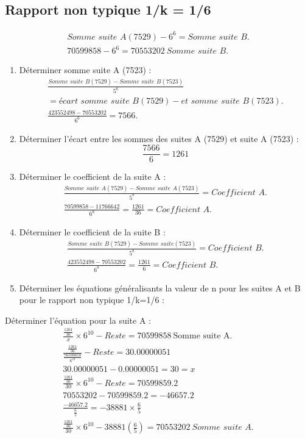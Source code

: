 \documentclass[11pt,a4paper]{article}
\begin{document}
\subsection{Rapport non typique 1/k = 1/6}
\begin{gather*}
\textit{Somme suite A}(7529)-6^{6}=\textit{Somme suite B.}\\
70599858-6^{6}=70553202\ \textit{Somme suite B.}
\end{gather*}
\begin{enumerate}[label=\arabic*.,start=2,leftmargin=*,itemsep=6pt]
\item Déterminer somme suite A (7523) :
\begin{gather*}
\frac{\textit{Somme suite B}(7529)-\textit{Somme suite B}(7523)}{5^{6}}\\
=\textit{écart somme suite B}(7529)-\textit{et somme suite B}(7523).\\
\frac{423552498-70553202}{6^{6}}=7566.
\end{gather*}
\item Déterminer l’écart entre les sommes des suites A (7529) et suite A (7523) :
\[
\frac{7566}{6}=1261
\]
\item Déterminer le coefficient de la suite A :
\begin{gather*}
\frac{\textit{Somme suite A}(7529)-\textit{Somme suite A}(7523)}{5^{8}}=\textit{Coefficient A.}\\
\frac{70599858-11766642}{6^{8}}=\frac{1261}{36}=\textit{Coefficient A.}
\end{gather*}
\item Déterminer le coefficient de la suite B :
\begin{gather*}
\frac{\textit{Somme suite B}(7529)-\textit{Somme suite}(7523)}{5^{8}}=\textit{Coefficient B.}\\
\frac{423552498-70553202}{6^{8}}=\frac{1261}{6}=\textit{Coefficient B.}
\end{gather*}
\item Déterminer les équations généralisants la valeur de n pour les suites A et B pour le rapport non typique 1/k=1/6 :
\end{enumerate}
Déterminer l’équation pour la suite A :
\begin{gather*}
\frac{\frac{1261}{36}}{x}\times6^{10}-\textit{Reste}=70599858\ \text{Somme suite A.}\\
\frac{\frac{1261}{36}}{\frac{70599858}{6^{10}}}-\textit{Reste}=30.00000051\\
30.00000051-0.00000051=30=x\\
\frac{\frac{1261}{36}}{30}\times6^{10}-\textit{Reste}=70599859.2\\
70553202-70599859.2=-46657.2\\
\frac{-46657.2}{\frac{6}{5}}=-38881\times\frac{6}{5}\\
\frac{\frac{1261}{36}}{30}\times6^{10}-38881\left(\frac{6}{5}\right)=70553202\ \textit{Somme suite A.}
\end{gather*}
\end{document}
